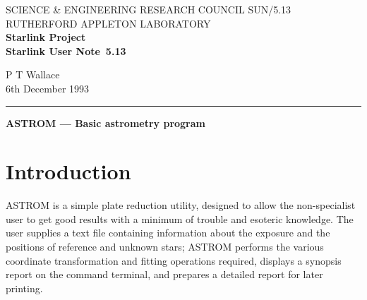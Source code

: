 \pagestyle{myheadings}

\newcommand{\stardoccategory}  {Starlink User Note}
\newcommand{\stardocinitials}  {SUN}
\newcommand{\stardocnumber}    {5.13}
\newcommand{\stardocauthors}   {P T Wallace}
\newcommand{\stardocdate}      {6th December 1993}
\newcommand{\stardoctitle}     {ASTROM --- Basic astrometry program}

\newcommand{\stardocname}{\stardocinitials /\stardocnumber}
\markright{\stardocname}
\setlength{\textwidth}{160mm}
\setlength{\textheight}{240mm}
\setlength{\topmargin}{-5mm}
\setlength{\oddsidemargin}{0mm}
\setlength{\evensidemargin}{0mm}
\setlength{\parindent}{0mm}
\setlength{\parskip}{\medskipamount}
\setlength{\unitlength}{1mm}


\thispagestyle{empty}
SCIENCE \& ENGINEERING RESEARCH COUNCIL \hfill \stardocname\\
RUTHERFORD APPLETON LABORATORY\\
{\large\bf Starlink Project\\}
{\large\bf \stardoccategory\ \stardocnumber}
\begin{flushright}
\stardocauthors\\
\stardocdate
\end{flushright}
\vspace{-4mm}
\rule{\textwidth}{0.5mm}
\vspace{5mm}
\begin{center}
{\Large\bf \stardoctitle}
\end{center}
\vspace{5mm}
\setlength{\parskip}{0mm}
\setlength{\parskip}{\medskipamount}
\markright{\stardocname}


\newcommand{\radec}     {$[\alpha,\delta\,]$}
\newcommand{\xy}        {$[x,y\,]$}
\newcommand{\xieta}     {$[\xi,\eta\,]$}


\section{Introduction}
ASTROM is a simple plate reduction utility, designed to allow the
non-specialist user to get good results with a minimum of trouble and
esoteric knowledge.  The user supplies a text file containing
information about the
exposure and the positions of reference and unknown stars;  ASTROM
performs the various coordinate transformation and fitting operations
required, displays a synopsis report on the command terminal, and
prepares a detailed report for later printing.

